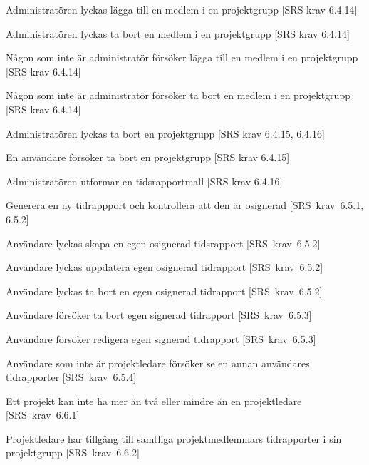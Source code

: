 \documentclass[a4paper]{article}
\begin{document}
\begin{appendices}
\begin{FT}
\item 
Administratören lyckas lägga till en medlem i en projektgrupp [SRS krav 6.4.14]

\item 
Administratören lyckas ta bort en medlem i en projektgrupp [SRS krav 6.4.14]

\item 
Någon som inte är administratör försöker lägga till en medlem i en projektgrupp [SRS krav 6.4.14]

\item 
Någon som inte är administratör försöker ta bort en medlem i en projektgrupp [SRS krav 6.4.14]

\item
Administratören lyckas ta bort en projektgrupp [SRS krav 6.4.15, 6.4.16]

\item
En användare försöker ta bort en projektgrupp [SRS krav 6.4.15]

\item 
Administratören utformar en tidsrapportmall [SRS krav 6.4.16]


\item
Generera en ny tidrappport och kontrollera att den är osignerad [SRS~krav~6.5.1, 6.5.2]

\item
Användare lyckas skapa en  egen osignerad tidsrapport [SRS~krav~6.5.2]

\item
Användare lyckas uppdatera egen osignerad tidrapport [SRS~krav~6.5.2]

\item
Användare lyckas ta bort en egen osignerad tidrapport [SRS~krav~6.5.2]

\item
Användare försöker ta bort egen signerad tidrapport [SRS~krav~6.5.3]

\item
Användare försöker redigera egen signerad tidrapport [SRS~krav~6.5.3]

\item
Användare som inte är projektledare försöker se en annan användares tidrapporter [SRS~krav~6.5.4]

\item
Ett projekt kan inte ha mer än två eller mindre än en projektledare [SRS~krav~6.6.1]

\item
Projektledare har tillgång till samtliga projektmedlemmars tidrapporter i sin projektgrupp [SRS~krav~6.6.2]


\end{FT}
\end{appendices}
\end{document}

